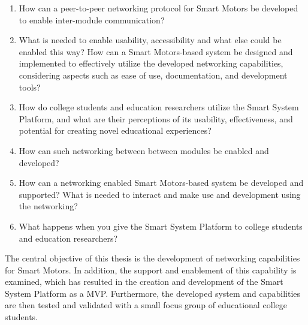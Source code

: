 \begin{enumerate}
    \item How can a peer-to-peer networking protocol for Smart Motors be developed to enable inter-module communication?
    \item What is needed to enable usability, accessibility and what else could be enabled this way?
    How can a Smart Motors-based system be designed and implemented to effectively utilize the developed networking capabilities, considering aspects such as ease of use, documentation, and development tools?
    \item How do college students and education researchers utilize the Smart System Platform, and what are their perceptions of its usability, effectiveness, and potential for creating novel educational experiences?


    
    \item How can such networking between between modules be enabled and developed?
    \item How can a networking enabled Smart Motors-based system be developed and supported? What is needed to interact and make use and development using the networking?
    \item What happens when you give the Smart System Platform to college students and education researchers?
\end{enumerate}

The central objective of this thesis is the development of networking capabilities for Smart Motors. In addition, the support and enablement of this capability is examined, which has resulted in the creation and development of the Smart System Platform as a MVP. Furthermore, the developed system and capabilities are then tested and validated with a small focus group of educational college students. 



